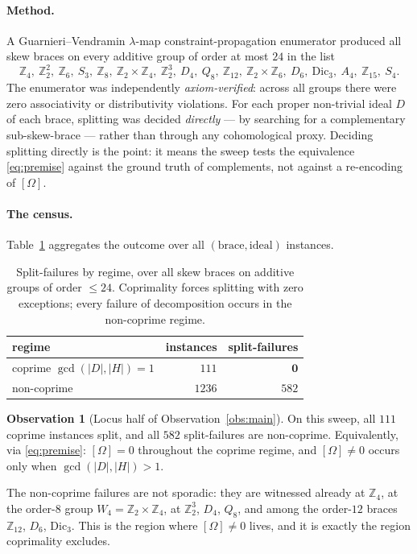 \documentclass[11pt]{article}
\theoremstyle{definition}
\newtheorem{observation}[theorem]{Observation}
\newcommand{\Z}{\mathbb{Z}}
\newcommand{\gcdd}{\gcd}
\begin{document}
\paragraph{Method.}
A Guarnieri--Vendramin $\lambda$-map constraint-propagation enumerator produced all skew
braces on every additive group of order at most $24$ in the list
\[
\Z_4,\ \Z_2^2,\ \Z_6,\ S_3,\ \Z_8,\ \Z_2\times\Z_4,\ \Z_2^3,\ D_4,\ Q_8,\ \Z_{12},\
\Z_2\times\Z_6,\ D_6,\ \mathrm{Dic}_3,\ A_4,\ \Z_{15},\ S_4 .
\]
The enumerator was independently \emph{axiom-verified}: across all groups there were zero
associativity or distributivity violations. For each proper non-trivial ideal $D$ of each
brace, splitting was decided \emph{directly} --- by searching for a complementary
sub-skew-brace --- rather than through any cohomological proxy. Deciding splitting directly
is the point: it means the sweep tests the equivalence \eqref{eq:premise} against the ground
truth of complements, not against a re-encoding of $[\Omega]$.

\paragraph{The census.}
Table~\ref{tab:census} aggregates the outcome over all $(\text{brace},\text{ideal})$
instances.

\begin{table}[h]
\centering
\begin{tabular}{lrr}
\toprule
regime & instances & split-failures\\
\midrule
coprime $\gcdd(|D|,|H|)=1$ & $111$ & $\mathbf{0}$\\
non-coprime & $1236$ & $582$\\
\bottomrule
\end{tabular}
\caption{Split-failures by regime, over all skew braces on additive groups of order
$\le 24$. Coprimality forces splitting with zero exceptions; every failure of decomposition
occurs in the non-coprime regime.}
\label{tab:census}
\end{table}

\begin{observation}[Locus half of Observation~\ref{obs:main}]\label{obs:locus}
On this sweep, all $111$ coprime instances split, and all $582$ split-failures are
non-coprime. Equivalently, via \eqref{eq:premise}: $[\Omega]=0$ throughout the coprime
regime, and $[\Omega]\ne0$ occurs only when $\gcdd(|D|,|H|)>1$.
\end{observation}

The non-coprime failures are not sporadic: they are witnessed already at
$\Z_4$, at the order-$8$ group $W_4=\Z_2\times\Z_4$, at $\Z_2^3$, $D_4$, $Q_8$, and among the
order-$12$ braces $\Z_{12}$, $D_6$, $\mathrm{Dic}_3$. This is the region where $[\Omega]\ne0$
lives, and it is exactly the region coprimality excludes.
\end{document}
